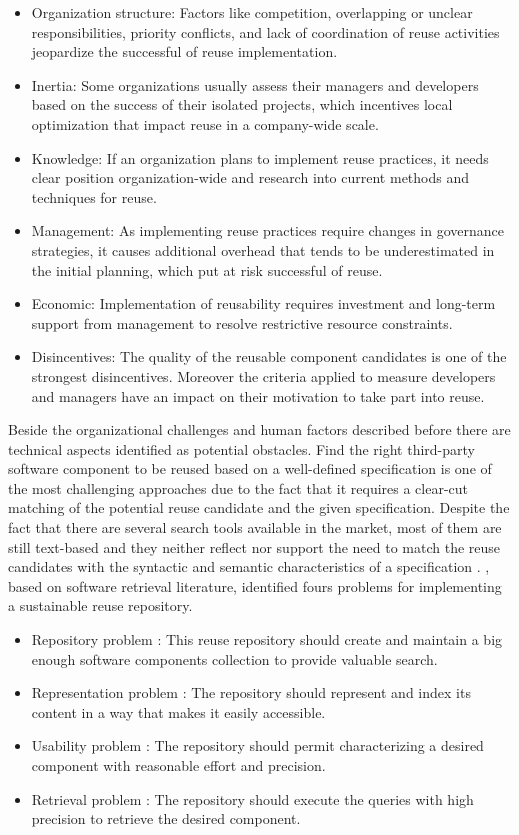 \begin{itemize}
\item Organization structure: Factors like competition, overlapping or unclear responsibilities, priority conflicts, and lack of coordination of reuse activities jeopardize the successful of reuse implementation. 
\item Inertia: Some organizations usually assess their managers and developers based on the success of their isolated projects, which incentives local optimization that impact reuse in a company-wide scale. 
\item Knowledge: If an organization plans to implement reuse practices, it needs clear position organization-wide and research into current methods and techniques for reuse.
\item Management: As implementing reuse practices require changes in governance strategies, it causes additional overhead that tends to be underestimated in the initial planning, which put at risk successful of reuse.
\item Economic: Implementation of reusability requires investment and long-term support from management to resolve restrictive resource constraints.
\item Disincentives: The quality of the reusable component candidates is one of the strongest disincentives. Moreover the criteria applied to measure developers and managers have an impact on their motivation to take part into reuse.
\end{itemize}

Beside the organizational challenges and human factors described before there are technical aspects identified as potential obstacles. Find the right third-party software component to be reused based on a well-defined specification is one of the most challenging approaches due to the fact that it requires a clear-cut matching of the potential reuse candidate and the given specification. Despite the fact that there are several search tools available in the market, most of them are still text-based and they neither reflect nor support the need to match the reuse candidates with the syntactic and semantic characteristics of a specification \cite{Hummel2013}. \citet{Hummel2013}, based on software retrieval literature, identified fours problems for implementing a sustainable reuse repository.

\begin{itemize}
\item Repository problem \cite{Seacord1999}: This reuse repository should create and maintain a big enough software components collection to provide valuable search.
\item Representation problem \cite{Pole1994}: The repository should represent and index its content in a way that makes it easily accessible.
\item Usability problem \cite{Garcia2006}: The repository should permit characterizing a desired component with reasonable effort and precision.
\item Retrieval problem \cite{Prieto-Diaz1987}: The repository should execute the queries with high precision to retrieve the desired component.
\end{itemize}

